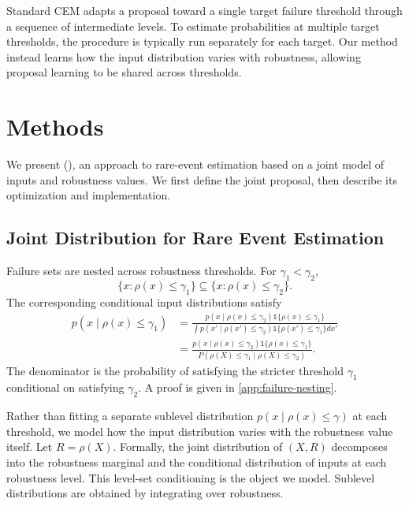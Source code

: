 \documentclass[twoside,11pt]{article}
\begin{document}
Standard CEM adapts a proposal toward a single target failure threshold through a sequence of intermediate levels. To estimate probabilities at multiple target thresholds, the procedure is typically run separately for each target. Our method instead learns how the input distribution varies with robustness, allowing proposal learning to be shared across thresholds.

\section{Methods}
\label{sec:method}

We present \algfullname{} (\algname{}), an approach to rare-event estimation based on a joint model of inputs and robustness values. We first define the joint proposal, then describe its optimization and implementation.

\subsection{Joint Distribution for Rare Event Estimation}

Failure sets are nested across robustness thresholds. For $\gamma_1<\gamma_2$,
\[
    \{x:\rho(x)\leq\gamma_1\}
    \subseteq
    \{x:\rho(x)\leq\gamma_2\}.
\]
The corresponding conditional input distributions satisfy
\begin{align*}
    p(x \mid \rho(x)\leq\gamma_1)
    &=
    \frac{
        p(x \mid \rho(x)\leq\gamma_2)
        \mathds{1}\{\rho(x)\leq\gamma_1\}
    }{
        \int
        p(x' \mid \rho(x')\leq\gamma_2)
        \mathds{1}\{\rho(x')\leq\gamma_1\}
        dx'
    } \\
    &=
    \frac{
        p(x \mid \rho(x)\leq\gamma_2)
        \mathds{1}\{\rho(x)\leq\gamma_1\}
    }{
        P(\rho(X)\leq\gamma_1
        \mid
        \rho(X)\leq\gamma_2)
    }.
\end{align*}
The denominator is the probability of satisfying the stricter threshold $\gamma_1$ conditional on satisfying $\gamma_2$. A proof is given in \cref{app:failure-nesting}.

Rather than fitting a separate sublevel distribution $p(x\mid\rho(x)\leq\gamma)$ at each threshold, we model how the input distribution varies with the robustness value itself. Let $R=\rho(X)$. Formally, the joint distribution of $(X,R)$ decomposes into the robustness marginal and the conditional distribution of inputs at each robustness level. This level-set conditioning is the object we model. Sublevel distributions are obtained by integrating over robustness. 
\end{document}
